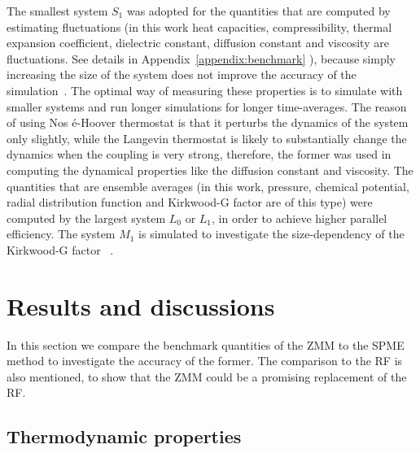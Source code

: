 \documentclass[a4paper,preprint,unsortedaddress,onecolumn,fleqn]{revtex4}
\begin{document}

The smallest system $S_{1}$ was adopted for the quantities that are computed
by estimating fluctuations (in this work heat capacities, compressibility,
thermal expansion coefficient, dielectric constant, diffusion constant and
viscosity are fluctuations. See details in Appendix~\ref{appendix:benchmark}%
), because simply increasing the size of the system does not improve the
accuracy of the simulation~\cite%
{milchev1986fluctuations,ferrenberg1991statistical}. The optimal way of
measuring these properties is to simulate with smaller systems 
and run longer simulations for longer time-averages. The reason of using Nos%
\'{e}-Hoover thermostat is that it perturbs the dynamics of the system only
slightly, while the Langevin thermostat is likely to substantially change
the dynamics when the coupling is very strong, therefore, the former was
used in computing the dynamical properties like the diffusion constant and
viscosity. The quantities that are ensemble averages (in this work,
pressure, chemical potential, radial distribution function and Kirkwood-G
factor are of this type) were computed by the largest system $L_{0}$ or $%
L_{1}$, in order to achieve higher parallel efficiency. The system $M_{1}$
is simulated to investigate the size-dependency of the Kirkwood-G factor~%
\cite{vanderSpoel2006origin}.

\section{Results and discussions}

In this section we compare the benchmark quantities of the ZMM to the
SPME method to investigate the accuracy of the former. The comparison to the
RF  is also mentioned, to show that the ZMM could be a promising
replacement of the RF.

\subsection{Thermodynamic properties}
\end{document}
